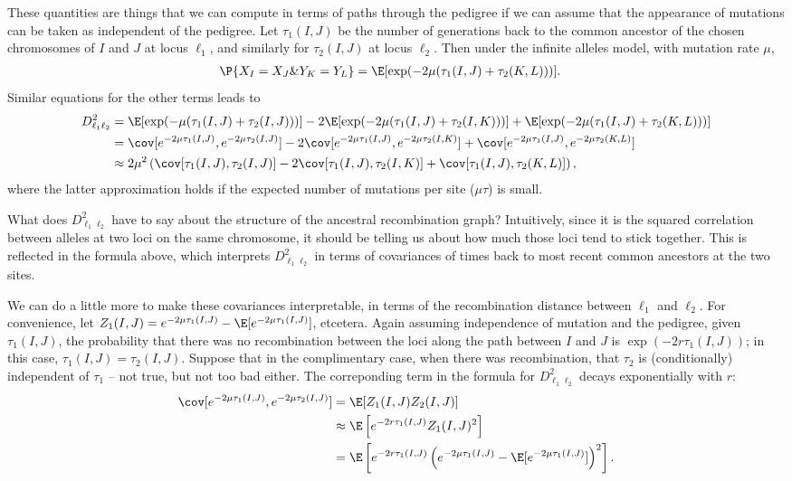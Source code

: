 These quantities are things that we can compute in terms of paths through the pedigree
if we can assume that the appearance of mutations can be taken as independent of the pedigree.
Let $\tau_1(I,J)$ be the number of generations back to the common ancestor of the chosen chromosomes of $I$ and $J$ at locus $\ell_1$,
and similarly for $\tau_2(I,J)$ at locus $\ell_2$.
Then under the infinite alleles model,
with mutation rate $\mu$, 
\begin{align}
  \P\{ X_I = X_J \& Y_K = Y_L \} &= \E[ \exp(-2\mu(\tau_1(I,J)+\tau_2(K,L))) ] .
\end{align}
Similar equations for the other terms leads to
\begin{align}
  D_{\ell_1 \ell_2}^2 &= \E[ \exp(-\mu(\tau_1(I,J)+\tau_2(I,J))) ] - 2 \E[ \exp(-2\mu(\tau_1(I,J)+\tau_2(I,K))) ] + \E[ \exp(-2\mu(\tau_1(I,J)+\tau_2(K,L))) ] \\
    &= \cov[ e^{-2\mu\tau_1(I,J)}, e^{-2\mu \tau_2(I,J)} ] - 2 \cov[ e^{-2\mu\tau_1(I,J)}, e^{-2\mu \tau_2(I,K)} ] + \cov[ e^{-2\mu\tau_1(I,J)}, e^{-2\mu \tau_2(K,L)} ] \\
    &\approx 2\mu^2 \left( \cov[ \tau_1(I,J),  \tau_2(I,J) ] - 2 \cov[ \tau_1(I,J),  \tau_2(I,K) ] + \cov[ \tau_1(I,J),  \tau_2(K,L) ] \right) ,
\end{align}
where the latter approximation holds if the expected number of mutations per site ($\mu \tau$) is small.


What does $D_{\ell_1 \ell_2}^2$ have to say about the structure of the ancestral recombination graph?
Intuitively, since it is the squared correlation between alleles at two loci on the same chromosome,
it should be telling us about how much those loci tend to stick together.
This is reflected in the formula above, which interprets $D_{\ell_1 \ell_2}^2$
in terms of covariances of times back to most recent common ancestors at the two sites.

We can do a little more to make these covariances interpretable,
in terms of the recombination distance between $\ell_1$ and $\ell_2$.
For convenience, let $Z_1(I,J) = e^{-2\mu \tau_1(I,J)} - \E[e^{-2\mu \tau_1(I,J)}]$, etcetera.
Again assuming independence of mutation and the pedigree,
given $\tau_1(I,J)$,
the probability that there was no recombination between the loci along the path between $I$ and $J$
is $\exp(- 2r\tau_1(I,J))$;
in this case, $\tau_1(I,J) = \tau_2(I,J)$.
Suppose that in the complimentary case, when there was recombination, that $\tau_2$ is (conditionally) independent of $\tau_1$ --
not true, but not too bad either.
The correponding term in the formula for $D_{\ell_1 \ell_2}^2$ decays exponentially with $r$:
\begin{align}
  \cov[ e^{-2\mu\tau_1(I,J)}, e^{-2\mu \tau_2(I,J)} ] &= \E[ Z_1(I,J) Z_2(I,J) ]  \\
        &\approx \E\left[ e^{-2r \tau_1(I,J)} Z_1(I,J)^2  \right] \\
        &= \E\left[ e^{-2r \tau_1(I,J)} \left( e^{-2\mu \tau_1(I,J)} - \E[e^{-2\mu \tau_1(I,J)}] \right)^2 \right] .
\end{align}

